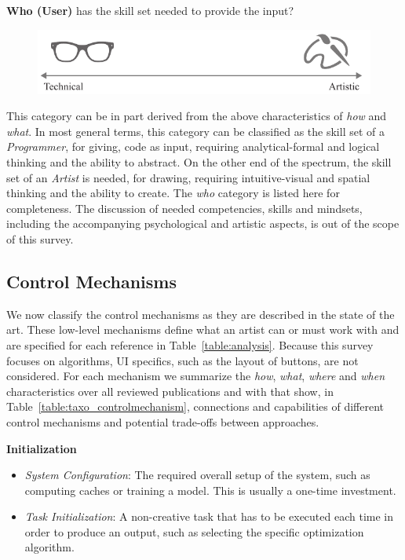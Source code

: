 \noindent\textbf{Who (User)} has the skill set needed to provide the input? 
\begin{figure}[H]
    \centering
        \includegraphics[width=\controlParamsFigWidth\linewidth]{figures/control_paradigms/who.pdf}
\end{figure}

This category can be in part derived from the above characteristics of \textit{how} and \textit{what}. In most general terms, this category can be classified as the skill set of a \textit{Programmer}, for giving, \eg code as input, requiring analytical-formal and logical thinking and the ability to abstract. On the other end of the spectrum, the skill set of an \textit{Artist} is needed, \eg for drawing, requiring intuitive-visual and spatial thinking and the ability to create. The \textit{who} category is listed here for completeness. The discussion of needed competencies, skills and mindsets, including the accompanying psychological and artistic aspects, is out of the scope of this survey.

\subsection{Control Mechanisms}\label{subsec:taxo_control_mechanism}
We now classify the control mechanisms as they are described in the state of the art. These low-level mechanisms define what an artist can or must work with and are specified for each reference in Table~\ref{table:analysis}. Because this survey focuses on algorithms, UI specifics, such as the layout of buttons, are not considered. For each mechanism we summarize the \textit{how}, \textit{what}, \textit{where} and \textit{when} characteristics over all reviewed publications and with that show, in Table~\ref{table:taxo_controlmechanism}, connections and capabilities of different control mechanisms and potential trade-offs between approaches.

\noindent\textbf{Initialization}
\begin{itemize}
    \item \textit{System Configuration}: The required overall setup of the system, such as computing caches or training a model. This is usually a one-time investment.
    \item \textit{Task Initialization}: A non-creative task that has to be executed each time in order to produce an output, such as selecting the specific optimization algorithm.
\end{itemize}

